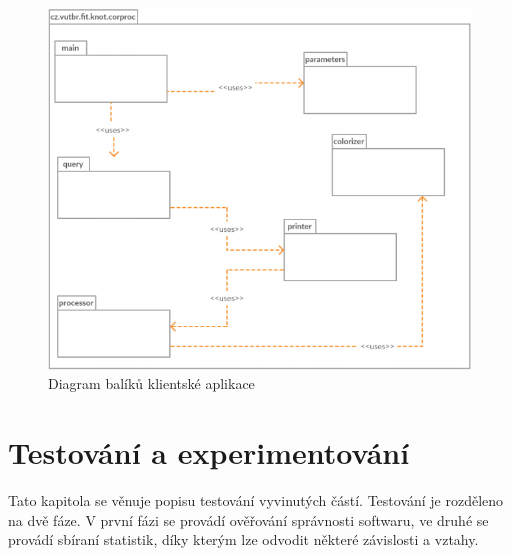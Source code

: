 \begin{figure}[H]
\begin{center}
	\includegraphics[scale=0.5]{obrazky-figures/ClientPackageDiagram.png}
\end{center}
	\caption{Diagram balíků klientské aplikace}
    \label{ClientPackageDiargamLbl}
\end{figure}



\chapter{Testování a experimentování}
\label{chapter7}

Tato kapitola se věnuje popisu testování vyvinutých částí. Testování je rozděleno na dvě fáze. V první fázi se provádí ověřování správnosti softwaru, ve druhé se provádí sbíraní statistik, díky kterým lze odvodit některé závislosti a vztahy.       


 

